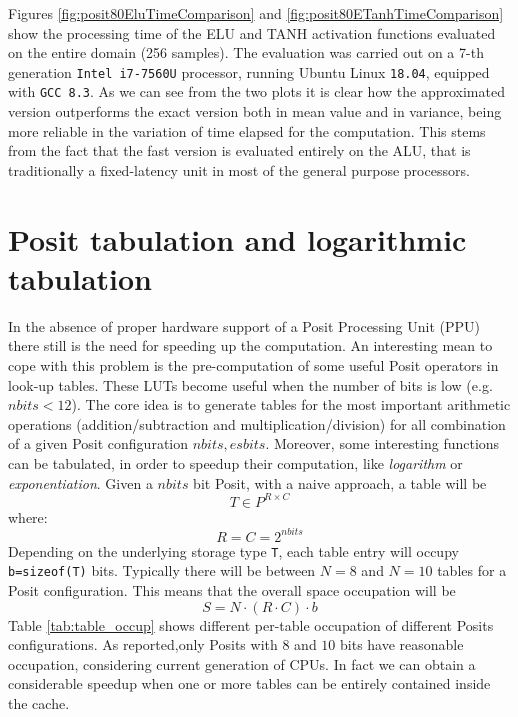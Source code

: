 Figures \ref{fig:posit80EluTimeComparison} and \ref{fig:posit80ETanhTimeComparison} show the processing time of the ELU and TANH activation functions evaluated on the entire  domain (256 samples). The evaluation was carried out on a 7-th generation \texttt{Intel i7-7560U} processor, running Ubuntu Linux \texttt{18.04}, equipped with \texttt{GCC 8.3}. As we can see from the two plots it is clear how the approximated version outperforms the exact version both in mean value and in variance, being more reliable in the variation of time elapsed for the computation. This stems from the fact that the fast version is evaluated entirely on the ALU, that is traditionally a fixed-latency unit in most of the general purpose processors.

\section{Posit tabulation and logarithmic tabulation}

In the absence of proper hardware support of a Posit Processing Unit (PPU) there still is the need for speeding up the computation. An interesting mean to cope with this problem is the pre-computation of some useful Posit operators in look-up tables. These LUTs become useful when the number of bits is low (e.g. $nbits < 12$).
The core idea is to generate tables for the most important arithmetic operations (addition/subtraction and multiplication/division) for all combination of a given Posit configuration $nbits,esbits$.
Moreover, some interesting functions can be tabulated, in order to speedup their computation, like \textit{logarithm} or \textit{exponentiation}.
Given a $nbits$ bit Posit, with a naive approach, a table will be \[ T \in P^{R \times C} \] where: \[ R=C=2^{nbits}   \]
Depending on the underlying storage type \texttt{T}, each table entry will occupy \texttt{b=sizeof(T)} bits. Typically there will be between $N=8$ and $N=10$ tables for a Posit configuration. This means that the overall space occupation will be \[ S=N \cdot (R \cdot C) \cdot b \]
Table \ref{tab:table_occup} shows different per-table occupation of different Posits configurations. As reported,only Posits with $8$ and $10$ bits have reasonable occupation, considering current generation of CPUs. In fact we can obtain a considerable speedup when one or more tables can be entirely contained inside the cache.

